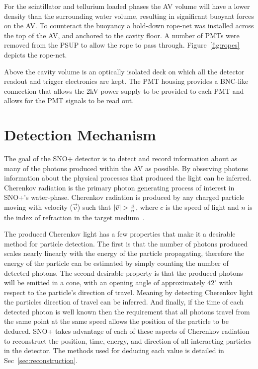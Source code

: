 For the scintillator and tellurium loaded phases the AV volume will have
a lower density than the surrounding water volume, resulting in significant buoyant
forces on the AV\@.
To counteract the buoyancy a hold-down rope-net was installed across the top
of the AV, and anchored to the cavity floor.
A number of PMTs were removed from the PSUP to allow the rope to pass through.
Figure~\ref{fig:ropes} depicts the rope-net.

Above the cavity volume is an optically isolated deck on which all the detector
readout and trigger electronics are kept.
The PMT housing provides a BNC-like connection that allows the 2kV power 
supply to be provided to each PMT and allows for the PMT signals to be read
out.

\section{Detection Mechanism}
The goal of the SNO+ detector is to detect and record information about as
many of the photons produced within the AV as possible.
By observing photons information about the physical processes that produced
the light can be inferred.
Cherenkov radiation is the primary photon generating process of interest in
SNO+'s water-phase.
Cherenkov radiation is produced by any charged particle moving with
velocity ($\vec{v}$) such that $\abs{\vec{v}} > \frac{c}{n}$, where $c$ is the speed
of light and $n$ is the index of refraction in the target medium~\citep{cherenkov}.

The produced Cherenkov light has a few properties that make it a desirable
method for particle detection.
The first is that the number of photons produced scales nearly linearly
with the energy of the particle propagating, therefore the energy of the particle
can be estimated by simply counting the number of detected photons.
The second desirable property is that the produced photons will be
emitted in a cone, with an opening angle of approximately $42^{\circ}$ with
respect to the particle's direction of travel.
Meaning by detecting Cherenkov light the particles direction of travel
can be inferred.
And finally, if the time of each detected photon is well known then
the requirement that all photons travel from the same point at the same speed
allows the position of the particle to be deduced.
SNO+ takes advantage of each of these aspects of Cherenkov radiation to reconstruct
the position, time, energy, and direction of all interacting particles in the
detector.
The methods used for deducing each value is detailed in Sec~\ref{sec:reconstruction}.

